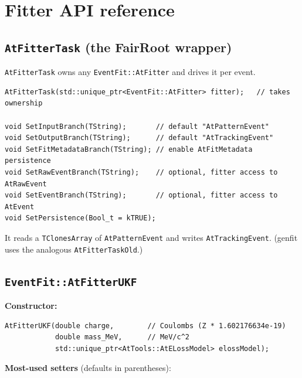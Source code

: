 \documentclass[11pt,a4paper]{article}
\newcommand{\code}[1]{\texttt{\small #1}}
\begin{document}
\section{Fitter API reference}\label{sec:fitterapi}

\subsection{\texttt{AtFitterTask} (the FairRoot wrapper)}

\code{AtFitterTask} owns any \code{EventFit::\allowbreak AtFitter} and drives it per event.

\begin{lstlisting}
AtFitterTask(std::unique_ptr<EventFit::AtFitter> fitter);   // takes ownership

void SetInputBranch(TString);       // default "AtPatternEvent"
void SetOutputBranch(TString);      // default "AtTrackingEvent"
void SetFitMetadataBranch(TString); // enable AtFitMetadata persistence
void SetRawEventBranch(TString);    // optional, fitter access to AtRawEvent
void SetEventBranch(TString);       // optional, fitter access to AtEvent
void SetPersistence(Bool_t = kTRUE);
\end{lstlisting}

It reads a \code{TClonesArray} of \code{AtPatternEvent} and writes
\code{AtTrackingEvent}. (genfit uses the analogous \code{AtFitterTaskOld}.)

\subsection{\texttt{EventFit::AtFitterUKF}}

\textbf{Constructor:}
\begin{lstlisting}
AtFitterUKF(double charge,        // Coulombs (Z * 1.602176634e-19)
            double mass_MeV,      // MeV/c^2
            std::unique_ptr<AtTools::AtELossModel> elossModel);
\end{lstlisting}

\textbf{Most-used setters} (defaults in parentheses):
\end{document}
